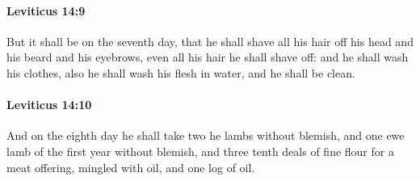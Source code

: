 		\paragraph{Leviticus 14:9} %
			\label{LEVITICUS-14-9}

			But it shall be on the seventh day, that he shall shave all his hair off his head and his beard and his eyebrows, even all his hair he shall shave off: and he shall wash his clothes, also he shall wash his flesh in water, and he shall be clean.


		\paragraph{Leviticus 14:10} %
			\label{LEVITICUS-14-10}

			And on the eighth day he shall take two he lambs without blemish, and one ewe lamb of the first year without blemish, and three tenth deals of fine flour for a meat offering, mingled with oil, and one log of oil.

